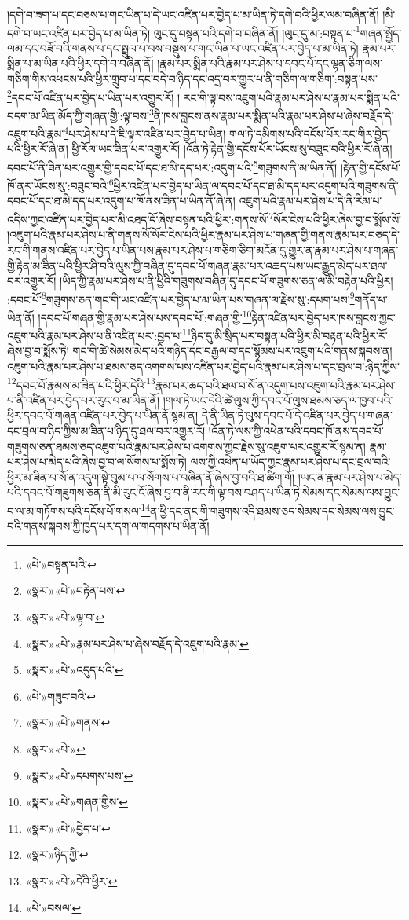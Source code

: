 །དགེ་བ་ཟག་པ་དང་བཅས་པ་གང་ཡིན་པ་དེ་ཡང་འཛིན་པར་བྱེད་པ་མ་ཡིན་ཏེ་དགེ་བའི་ཕྱིར་ལམ་བཞིན་ནོ། །མི་དགེ་བ་ཡང་འཛིན་པར་བྱེད་པ་མ་ཡིན་ཏེ། ལུང་དུ་བསྟན་པའི་དགེ་བ་བཞིན་ནོ། །ལུང་དུ་མ་:བསྟན་པ་\footnote{«པེ་»བསྟན་པའི་}གཞན་སྤྱོད་ལམ་དང་བཟོ་བའི་གནས་པ་དང་སྤྲུལ་པ་བས་བསྡུས་པ་གང་ཡིན་པ་ཡང་འཛིན་པར་བྱེད་པ་མ་ཡིན་ཏེ། རྣམ་པར་སྨིན་པ་མ་ཡིན་པའི་ཕྱིར་དགེ་བ་བཞིན་ནོ། །རྣམ་པར་སྨིན་པའི་རྣམ་པར་ཤེས་པ་དབང་པོ་དང་ལྷན་ཅིག་ལས་གཅིག་གིས་འཕངས་པའི་ཕྱིར་གྲུབ་པ་དང་བདེ་བ་ཉིད་དང་འདྲ་བར་གྱུར་པ་ནི་གཅིག་ལ་གཅིག་:བསྟན་པས་\footnote{«སྣར་»«པེ་»བརྟེན་པས་}དབང་པོ་འཛིན་པར་བྱེད་པ་ཡིན་པར་འགྱུར་རོ། །
རང་གི་ལྟ་བས་འཇུག་པའི་རྣམ་པར་ཤེས་པ་རྣམ་པར་སྨིན་པའི་བདག་མ་ཡིན་མོད་ཀྱི་གཞན་གྱི་:ལྟ་བས་\footnote{«སྣར་»«པེ་»ལྟ་བ་}ནི་ཁས་བླངས་ནས་རྣམ་པར་སྨིན་པའི་རྣམ་པར་ཤེས་པ་ཞེས་བརྗོད་དེ་འཇུག་པའི་རྣམ་\footnote{«སྣར་»«པེ་»རྣམ་པར་ཤེས་པ་ཞེས་བརྗོད་དེ་འཇུག་པའི་རྣམ་}པར་ཤེས་པ་དེ་ཇི་ལྟར་འཛིན་པར་བྱེད་པ་ཡིན། གལ་ཏེ་དམིགས་པའི་དངོས་པོར་རང་གིར་བྱེད་པའི་ཕྱིར་རོ་ཞེ་ན། ཕྱི་རོལ་ཡང་ཟིན་པར་འགྱུར་རོ། །འོན་ཏེ་རྟེན་གྱི་དངོས་པོར་ཡོངས་སུ་བཟུང་བའི་ཕྱིར་རོ་ཞེ་ན། དབང་པོ་ནི་ཟིན་པར་འགྱུར་གྱི་དབང་པོ་དང་ཐ་མི་དད་པར་:འདུག་པའི་\footnote{«སྣར་»«པེ་»འདུད་པའི་}གཟུགས་ནི་མ་ཡིན་ནོ། །རྟེན་གྱི་དངོས་པོ་ཁོ་ནར་ཡོངས་སུ་:བཟུང་བའི་\footnote{«པེ་»གཟུང་བའི་}ཕྱིར་འཛིན་པར་བྱེད་པ་ཡིན་ལ་དབང་པོ་དང་ཐ་མི་དད་པར་འདུག་པའི་གཟུགས་ནི་དབང་པོ་དང་ཐ་མི་དད་པར་འདུག་པ་ཁོ་ནས་ཟིན་པ་ཡིན་ནོ་ཞེ་ན། འཇུག་པའི་རྣམ་པར་ཤེས་པ་དེ་ནི་རིམ་པ་འདིས་ཀྱང་འཛིན་པར་བྱེད་པར་མི་འཐད་དོ་ཞེས་བསྟན་པའི་ཕྱིར་:གནས་སོ་\footnote{«སྣར་»«པེ་»གནས་}སོར་ངེས་པའི་ཕྱིར་ཞེས་བྱ་བ་སྨོས་སོ། །འཇུག་པའི་རྣམ་པར་ཤེས་པ་ནི་གནས་སོ་སོར་ངེས་པའི་ཕྱིར་རྣམ་པར་ཤེས་པ་གཞན་གྱི་གནས་རྣམ་པར་བཅད་དེ་རང་གི་གནས་འཛིན་པར་བྱེད་པ་ཡིན་པས་རྣམ་པར་ཤེས་པ་གཅིག་ཅིག་མངོན་དུ་གྱུར་ན་རྣམ་པར་ཤེས་པ་གཞན་གྱི་རྟེན་མ་ཟིན་པའི་ཕྱིར་ཤི་བའི་ལུས་ཀྱི་བཞིན་དུ་དབང་པོ་གཞན་རྣམ་པར་འཆད་པས་ཡང་རྒྱུད་མེད་པར་ཐལ་བར་འགྱུར་རོ། །ཡིད་ཀྱི་རྣམ་པར་ཤེས་པ་ནི་ཕྱིའི་གཟུགས་བཞིན་དུ་དབང་པོ་གཟུགས་ཅན་ལ་མི་བརྟེན་པའི་ཕྱིར། :དབང་པོ་\footnote{«སྣར་»«པེ་»}གཟུགས་ཅན་གང་གི་ཡང་འཛིན་པར་བྱེད་པ་མ་ཡིན་པས་གཞན་ལ་རྗེས་སུ་:དཔག་པས་\footnote{«སྣར་»«པེ་»དཔགས་པས་}གནོད་པ་ཡིན་ནོ། །དབང་པོ་གཞན་གྱི་རྣམ་པར་ཤེས་པས་དབང་པོ་:གཞན་གྱི་\footnote{«སྣར་»«པེ་»གཞན་གྱིས་}རྟེན་འཛིན་པར་བྱེད་པར་ཁས་བླངས་ཀྱང་འཇུག་པའི་རྣམ་པར་ཤེས་པ་ནི་འཛིན་པར་:བྱད་པ་\footnote{«སྣར་»«པེ་»བྱེད་པ་}ཉིད་དུ་མི་སྲིད་པར་བསྟན་པའི་ཕྱིར་མི་བརྟན་པའི་ཕྱིར་རོ་ཞེས་བྱ་བ་སྨོས་ཏེ། གང་གི་ཚེ་སེམས་མེད་པའི་གཉིད་དང་བརྒྱལ་བ་དང་སྙོམས་པར་འཇུག་པའི་གནས་སྐབས་ན། འཇུག་པའི་རྣམ་པར་ཤེས་པ་ཐམས་ཅད་འགགས་པས་འཛིན་པར་བྱེད་པའི་རྣམ་པར་ཤེས་པ་དང་བྲལ་བ་:ཉིད་ཀྱིས་\footnote{«སྣར་»ཉིད་ཀྱི་}དབང་པོ་རྣམས་མ་ཟིན་པའི་ཕྱིར་དེའི་\footnote{«སྣར་»«པེ་»དེའི་ཕྱིར་}རྣམ་པར་ཆད་པའི་ཐལ་བ་སོ་ན་འདུག་པས་འཇུག་པའི་རྣམ་པར་ཤེས་པ་ནི་འཛིན་པར་བྱེད་པར་རུང་བ་མ་ཡིན་ནོ། །གལ་ཏེ་ཡང་དེའི་ཚེ་ལུས་ཀྱི་དབང་པོ་ལུས་ཐམས་ཅད་ལ་ཁྱབ་པའི་ཕྱིར་དབང་པོ་གཞན་འཛིན་པར་བྱེད་པ་ཡིན་ནོ་སྙམ་ན། དེ་ནི་ཡིན་ཏེ་ལུས་དབང་པོ་དེ་འཛིན་པར་བྱེད་པ་གཞན་དང་བྲལ་བ་ཉིད་ཀྱིས་མ་ཟིན་པ་ཉིད་དུ་ཐལ་བར་འགྱུར་རོ། །འོན་ཏེ་ལས་ཀྱི་འཕེན་པའི་དབང་ཁོ་ནས་དབང་པོ་གཟུགས་ཅན་ཐམས་ཅད་འཇུག་པའི་རྣམ་པར་ཤེས་པ་འགགས་ཀྱང་རྗེས་སུ་འཇུག་པར་འགྱུར་རོ་སྙམ་ན། རྣམ་པར་ཤེས་པ་མེད་པའི་ཞེས་བྱ་བ་ལ་སོགས་པ་སྨོས་ཏེ། ལས་ཀྱི་འཕེན་པ་ཡོད་ཀྱང་རྣམ་པར་ཤེས་པ་དང་བྲལ་བའི་ཕྱིར་མ་ཟིན་པ་སོ་ན་འདུག་སྟེ་བུམ་པ་ལ་སོགས་པ་བཞིན་ནོ་ཞེས་བྱ་བའི་ཐ་ཚིག་གོ། །ཡང་ན་རྣམ་པར་ཤེས་པ་མེད་པའི་དབང་པོ་གཟུགས་ཅན་ནི་མི་རུང་ངོ་ཞེས་བྱ་བ་ནི་རང་གི་ལྟ་བས་བཤད་པ་ཡིན་ཏེ་སེམས་དང་སེམས་ལས་བྱུང་བ་ལ་མ་གཏོགས་པའི་དངོས་པོ་གསལ་\footnote{«པེ་»བསལ་}ན་ཕྱི་དང་ནང་གི་གཟུགས་འདི་ཐམས་ཅད་སེམས་དང་སེམས་ལས་བྱུང་བའི་གནས་སྐབས་ཀྱི་ཁྱད་པར་དག་ལ་གདགས་པ་ཡིན་ནོ། 